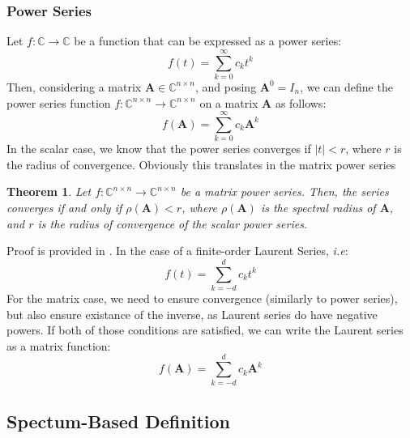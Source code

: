 \documentclass[12pt]{article}
\newtheorem{theorem}{Theorem}
\begin{document}
\subsubsection*{Power Series}
Let $f:\mathbb{C}\rightarrow\mathbb{C}$ be a function that can be expressed as a power series:
\begin{equation}
    f(t) = \sum_{k=0}^\infty c_k t^k
\end{equation}
Then, considering a matrix $\mathbf{A}\in\mathbb{C}^{n\times n}$, and posing $\mathbf{A}^0 = I_n$, we can define the power series function $f:\mathbb{C}^{n\times n}\rightarrow\mathbb{C}^{n\times n}$ on a matrix $\mathbf{A}$ as follows:
\begin{equation}
    f(\mathbf{A}) = \sum_{k=0}^\infty c_k \mathbf{A}^k
\end{equation}
In the scalar case, we know that the power series converges if $|t| < r$, where $r$ is the radius of convergence. Obviously this translates in the matrix power series
\begin{theorem}\label{th:power_convergence}
    Let $f:\mathbb{C}^{n\times n}\rightarrow\mathbb{C}^{n\times n}$ be a matrix power series. Then, the series converges if and only if $\rho(\mathbf{A}) < r$, where $\rho(\mathbf{A})$ is the spectral radius of $\mathbf{A}$, and $r$ is the radius of convergence of the scalar power series.
\end{theorem}
Proof is provided in \cite{frommer2008matrix}. In the case of a finite-order Laurent Series, \textit{i.e}:
\begin{equation}
    f(t) = \sum_{k=-d}^d c_k t^k
\end{equation}
For the matrix case, we need to ensure convergence (similarly to power series), but also ensure existance of the inverse, as Laurent series do have negative powers. If both of those conditions are satisfied, we can write the Laurent series as a matrix function:
\begin{equation}
    f(\mathbf{A}) = \sum_{k=-d}^d c_k \mathbf{A}^k
\end{equation}
\subsection{Spectum-Based Definition}
\end{document}
